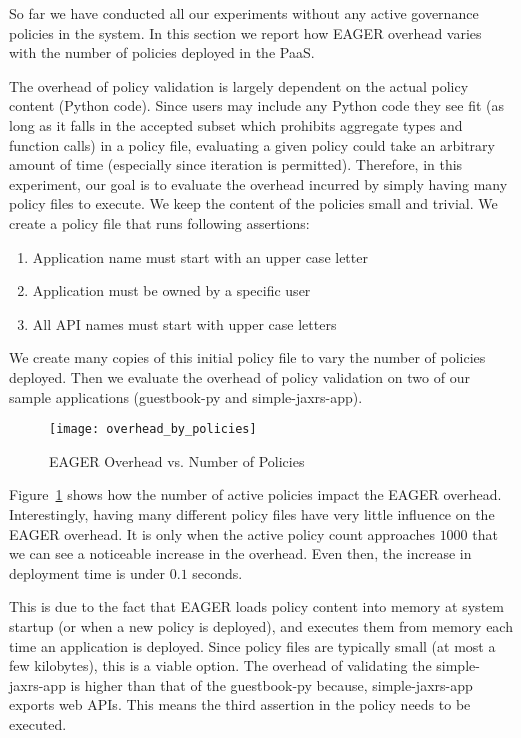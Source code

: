 So far we have conducted all our experiments without any active governance policies in the system. In this section we report how EAGER overhead
varies with the number of policies deployed in the PaaS. 

The overhead of policy validation is largely dependent on the actual policy
content (Python code). Since users may include any Python code they see fit
(as long as it falls in the accepted subset which prohibits aggregate
types and function calls) in a policy file, evaluating a
given policy could take an arbitrary amount of time (especially since
iteration is permitted). Therefore, in this
experiment, our goal is to evaluate the overhead incurred by simply having
many policy files to execute. We keep the content of the policies small and
trivial. We create a policy file that runs following assertions:
\begin{enumerate} 
\item Application name must start with an upper case letter
\item Application must be owned by a specific user 
\item All API names must start with upper case letters 
\end{enumerate} We create many copies of this
initial policy file to vary the number of policies deployed. Then we evaluate
the overhead of policy validation on two of our sample applications
(guestbook-py and simple-jaxrs-app). 

\begin{figure}
\centering
\texttt{[image: overhead\_by\_policies]}
\caption{EAGER Overhead vs. Number of Policies}
\label{fig:overhead_by_policies}
\end{figure}

Figure~\ref{fig:overhead_by_policies} shows how the number of active policies
impact the EAGER overhead. Interestingly, having many different policy files
have very little influence on the EAGER overhead. It is only when the active
policy count approaches $1000$ that we can see a noticeable increase in the
overhead. Even then, the increase in deployment time is under $0.1$ seconds. 

This is due to the fact that EAGER loads policy content into memory at system
startup (or when a new policy is deployed), and executes them from memory each
time an application is deployed. Since policy files are typically small (at
most a few kilobytes), this is a viable option. The overhead of validating the
simple-jaxrs-app is higher than that of the guestbook-py because,
simple-jaxrs-app exports web APIs. This means the third assertion in the
policy needs to be executed. 

